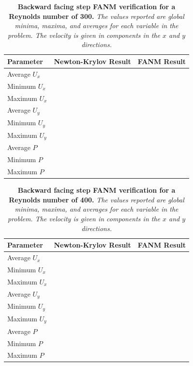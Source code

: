 \begin{table}[h!]
  \begin{center}
    \begin{tabular}{lll}\hline\hline
      \multicolumn{1}{l}{Parameter}& 
      \multicolumn{1}{l}{Newton-Krylov Result}&
      \multicolumn{1}{l}{FANM Result}\\
      \hline
      Average $U_x$ & \\
      Minimum $U_x$ & \\
      Maximum $U_x$ & \\
      \hline
      Average $U_y$ & \\
      Minimum $U_y$ & \\
      Maximum $U_y$ & \\
      \hline
      Average $P$ & \\
      Minimum $P$ & \\
      Maximum $P$ & \\
      \hline\hline
    \end{tabular}
  \end{center}
  \caption{\textbf{Backward facing step FANM verification for a
      Reynolds number of 300.} \textit{The values reported are global
      minima, maxima, and averages for each variable in the
      problem. The velocity is given in components in the $x$ and $y$
      directions.}}
  \label{tab:step_re300_results}
\end{table}

\begin{table}[h!]
  \begin{center}
    \begin{tabular}{lll}\hline\hline
      \multicolumn{1}{l}{Parameter}& 
      \multicolumn{1}{l}{Newton-Krylov Result}&
      \multicolumn{1}{l}{FANM Result}\\
      \hline
      Average $U_x$ & \\
      Minimum $U_x$ & \\
      Maximum $U_x$ & \\
      \hline
      Average $U_y$ & \\
      Minimum $U_y$ & \\
      Maximum $U_y$ & \\
      \hline
      Average $P$ & \\
      Minimum $P$ & \\
      Maximum $P$ & \\
      \hline\hline
    \end{tabular}
  \end{center}
  \caption{\textbf{Backward facing step FANM verification for a
      Reynolds number of 400.} \textit{The values reported are global
      minima, maxima, and averages for each variable in the
      problem. The velocity is given in components in the $x$ and $y$
      directions.}}
  \label{tab:step_re400_results}
\end{table}

